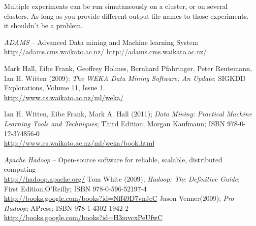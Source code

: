 \documentclass[a4paper]{book}
\begin{document}
\noindent Multiple experiments can be run simutaneously on a cluster, or on
several clusters. As long as you provide different output file names to those
experiments, it shouldn't be a problem.\\
% 
\begin{thebibliography}{999}

		\textit{ADAMS} -- Advanced Data mining and Machine learning System \\
		\url{http://adams.cms.waikato.ac.nz/}{}
		\url{http://adams.cms.waikato.ac.nz/}{}

	 	Mark Hall, Eibe Frank, Geoffrey Holmes, Bernhard Pfahringer, Peter
	 	Reutemann, Ian H. Witten (2009); \textit{The WEKA Data Mining Software: An
	 	Update}; SIGKDD Explorations, Volume 11, Issue 1. \\
		\url{http://www.cs.waikato.ac.nz/ml/weka/}{}

		Ian H. Witten, Eibe Frank, Mark A. Hall (2011); \textit{Data Mining: Practical
		Machine Learning Tools and Techniques}; Third Edition; Morgan Kaufmann; ISBN
		978-0-12-374856-0 \\
		\url{http://www.cs.waikato.ac.nz/ml/weka/book.html}{}

	 	\textit{Apache Hadoop} -- Open-source software for reliable, scalable,
	 	distributed computing \\
		\url{http://hadoop.apache.org/}{}
    	Tom White (2009); \textit{Hadoop: The Definitive Guide}; First
    	Edition;O'Reilly; ISBN 978-0-596-52197-4\\
    	\url{http://books.google.com/books?id=Nff49D7vnJcC}{}
    	Jason Venner(2009); \textit{Pro Hadoop}; APress; ISBN 978-1-4302-1942-2\\
    	\url{http://books.google.com/books?id=H3mvcxPeUfwC}{}
\end{thebibliography}
\end{document}
